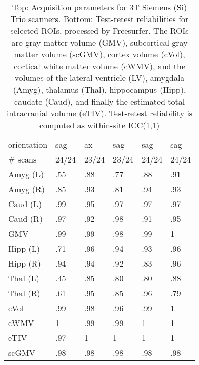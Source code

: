 \begin{table}
{\begin{tabular}{llllll}
orientation           &                sag &                 ax &                sag &                sag &                sag \\
\# scans & 24/24 & 23/24 & 23/24 & 24/24 & 24/24 \\
\midrule
Amyg (L)              &               .55 &               .88 &               .77 &               .88 &               .91 \\
Amyg (R)              &               .85 &               .93 &               .81 &               .94 &               .93 \\
Caud (L)              &               .99 &               .95 &               .97 &               .97 &               .97 \\
Caud (R)              &               .97 &               .92 &               .98 &               .91 &               .95 \\
GMV                   &               .99 &               .99 &               .98 &               .99 &               1   \\
Hipp (L)              &               .71 &               .96 &               .94 &               .93 &               .96 \\
Hipp (R)              &               .94 &               .94 &               .92 &               .83 &               .96 \\
Thal (L)              &               .45 &               .85 &               .80 &               .80 &               .88 \\
Thal (R)              &               .61 &               .95 &               .85 &               .96 &               .79 \\
cVol                  &               .99 &               .98 &               .96 &               .99 &               1   \\
cWMV                  &               1   &               .99 &               .99 &               1   &               1   \\
eTIV                  &               .97 &               1   &               1   &               1   &               1   \\
scGMV                 &               .98 &               .98 &               .98 &               .98 &               .98 \\
\bottomrule
\end{tabular}}
\fi
\caption{Top: Acquisition parameters for 3T Siemens (Si) Trio scanners. Bottom: Test-retest reliabilities for selected ROIs, processed by Freesurfer. The ROIs are gray matter volume (GMV), subcortical gray matter volume (scGMV), cortex volume (cVol), cortical white matter volume (cWMV), and the volumes of the lateral ventricle (LV), amygdala (Amyg), thalamus (Thal), hippocampus (Hipp), caudate (Caud), and finally the estimated total intracranial volume (eTIV). Test-retest reliability is computed as within-site ICC(1,1)} 
\label{tab:acquisition4}

\end{table}